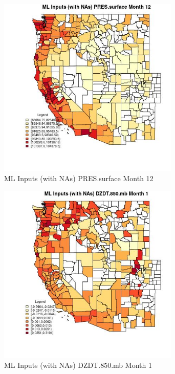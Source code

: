 \begin{figure} 
\centering  
\includegraphics[width=0.77\textwidth]{Code_Outputs/Report_ML_input_PM25_Step4_part_f_de_duplicated_aveswNAs_CountyPRESsurfacemedianMonth12.jpg} 
\caption{\label{fig:Report_ML_input_PM25_Step4_part_f_de_duplicated_aveswNAsCountyPRESsurfacemedianMonth12}ML Inputs (with NAs) PRES.surface Month 12} 
\end{figure} 
 

\begin{figure} 
\centering  
\includegraphics[width=0.77\textwidth]{Code_Outputs/Report_ML_input_PM25_Step4_part_f_de_duplicated_aveswNAs_CountyDZDT850mbmedianMonth1.jpg} 
\caption{\label{fig:Report_ML_input_PM25_Step4_part_f_de_duplicated_aveswNAsCountyDZDT850mbmedianMonth1}ML Inputs (with NAs) DZDT.850.mb Month 1} 
\end{figure} 
 

